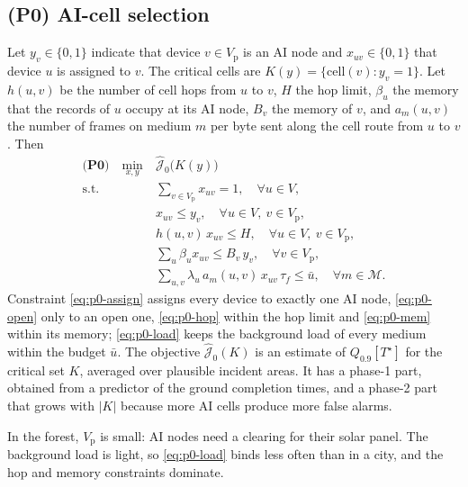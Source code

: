\subsection{(P0) AI-cell selection}
Let $y_v\in\{0,1\}$ indicate that device $v\in V_{\mathrm p}$ is an AI node and $x_{uv}\in\{0,1\}$ that device $u$ is
assigned to $v$. The critical cells are $K(y)=\{\mathrm{cell}(v):y_v=1\}$. Let $h(u,v)$ be the number of cell hops from
$u$ to $v$, $H$ the hop limit, $\beta_u$ the memory that the records of $u$ occupy at its AI node, $B_v$ the memory of
$v$, and $a_m(u,v)$ the number of frames on medium $m$ per byte sent along the cell route from $u$ to $v$. Then
\begin{subequations}\label{eq:p0}
\begin{align}
\textbf{(P0)}\quad \min_{x,y}\ & \hat{\mathcal J}_0\bigl(K(y)\bigr)\label{eq:p0-obj}\\
\text{s.t.}\ & \textstyle\sum_{v\in V_{\mathrm p}} x_{uv}=1,\quad \forall u\in V,\label{eq:p0-assign}\\
& x_{uv}\le y_v,\quad \forall u\in V,\ v\in V_{\mathrm p},\label{eq:p0-open}\\
& h(u,v)\,x_{uv}\le H,\quad \forall u\in V,\ v\in V_{\mathrm p},\label{eq:p0-hop}\\
& \textstyle\sum_{u}\beta_u x_{uv}\le B_v\,y_v,\quad \forall v\in V_{\mathrm p},\label{eq:p0-mem}\\
& \textstyle\sum_{u,v}\lambda_u\,a_m(u,v)\,x_{uv}\,\tau_f\le\bar u,\quad \forall m\in\mathcal M.\label{eq:p0-load}
\end{align}
\end{subequations}
Constraint \eqref{eq:p0-assign} assigns every device to exactly one AI node, \eqref{eq:p0-open} only to an open one,
\eqref{eq:p0-hop} within the hop limit and \eqref{eq:p0-mem} within its memory; \eqref{eq:p0-load} keeps the background
load of every medium within the budget $\bar u$. The objective $\hat{\mathcal J}_0(K)$ is an estimate of
$Q_{0.9}[T^\star]$ for the critical set $K$, averaged over plausible incident areas. It has a phase-1 part, obtained from
a predictor of the ground completion times, and a phase-2 part that grows with $|K|$ because more AI cells produce more
false alarms. 

In the forest, $V_{\mathrm p}$ is small: AI nodes need a clearing for their solar panel. The background load is light,
so \eqref{eq:p0-load} binds less often than in a city, and the hop and memory constraints dominate.

